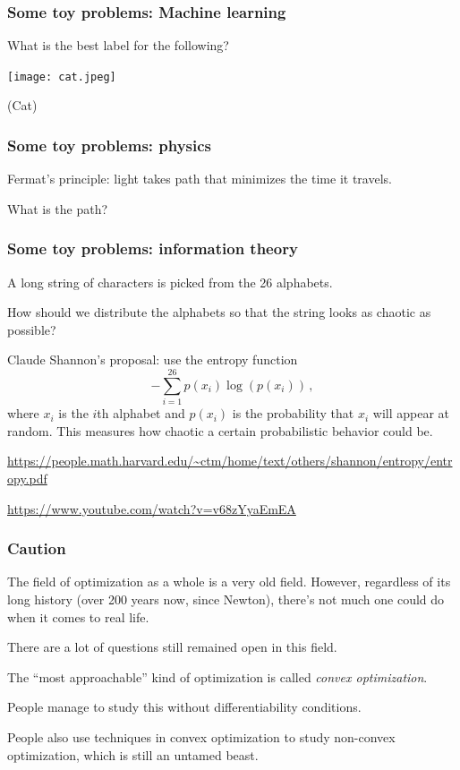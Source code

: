 \documentclass[aspectratio=169]{beamer}
\begin{document}
\begin{frame}
    \frametitle{Some toy problems: Machine learning}
    What is the best label for the following?

    \texttt{[image: cat.jpeg]}
    \pause

    (Cat)
\end{frame}

\begin{frame}
    \frametitle{Some toy problems: physics}
    Fermat's principle: light takes path that minimizes the time it travels.

    What is the path?
\end{frame}


\begin{frame}
    \frametitle{Some toy problems: information theory}
    A long string of characters is picked from the 26 alphabets.

    How should we distribute the alphabets so that the string looks as chaotic as possible?
    \pause

    Claude Shannon's proposal: use the entropy function
    \begin{equation*}
        - \sum_{i=1}^{26} p(x_i) \log (p(x_i)) \,,
    \end{equation*}
    where $x_i$ is the $i$th alphabet and $p(x_i)$ is the probability that $x_i$ 
    will appear at random.
    This measures how chaotic a certain probabilistic behavior could be.

    \url{https://people.math.harvard.edu/~ctm/home/text/others/shannon/entropy/entropy.pdf}

    \url{https://www.youtube.com/watch?v=v68zYyaEmEA}
\end{frame}

\begin{frame}
    \frametitle{Caution}
    The field of optimization as a whole is a very old field.
    However, regardless of its long history (over 200 years now, since Newton),
    there's not much one could do when it comes to real life. 

    There are a lot of questions still remained open in this field. 

    The ``most approachable'' kind of optimization is called \emph{convex optimization}. \pause
    
    People manage to study this without differentiability conditions. \pause

    People also use techniques in convex optimization to study 
    non-convex optimization, which is still an untamed beast.
\end{frame}
\end{document}
